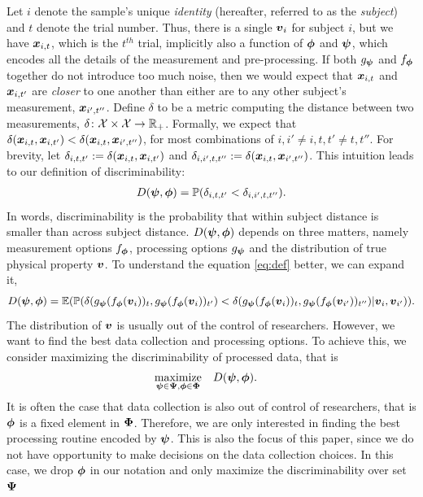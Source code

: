 \documentclass{article}
\begin{document}
Let $i$ denote the sample's unique \emph{identity} (hereafter, referred to as the \emph{subject}) and $t$ denote the trial number.  Thus, there is a single $\boldsymbol{v}_i$ for subject $i$, but we have $\boldsymbol{x}_{i,t}$, which is the $t^{th}$ trial, implicitly also a function of $\boldsymbol{\phi}$ and $\boldsymbol{\psi}$, which encodes all the details of the measurement and pre-processing. If both $g_{\boldsymbol{\psi}}$ and $f_{\boldsymbol{\phi}}$ together do not introduce too much noise, then we would expect that $\boldsymbol{x}_{i,t}$ and $\boldsymbol{x}_{i,t'}$ are \emph{closer} to one another than either are to any other subject's measurement, $\boldsymbol{x}_{i',t''}$. Define $\delta$ to be a metric computing the distance between two measurements, $\delta {\ensuremath{\colon}} \mathcal{X} \times \mathcal{X} \to \mathbb{R}_+$.  Formally, we expect that $\delta(\boldsymbol{x}_{i,t},\boldsymbol{x}_{i,t'}) < \delta(\boldsymbol{x}_{i,t},\boldsymbol{x}_{i',t''})$, for most combinations of $i,i'\neq i,t,t' \neq t,t''$.  
For brevity, let $\delta_{i,t,t'}:=\delta(\boldsymbol{x}_{i,t}, \boldsymbol{x}_{i,t'})$ and 
$\delta_{i,i',t,t''}:=\delta(\boldsymbol{x}_{i,t}, \boldsymbol{x}_{i',t''})$.  
This intuition leads to our definition of discriminability:
\begin{align}
	\label{eq:def}
	D(\boldsymbol{\psi},\boldsymbol{\phi}) = \mathbb{P}( \delta_{i,t,t'} < \delta_{i,i',t,t''}).
\end{align}
In words, discriminability is the probability that within subject distance is smaller than across subject distance. $D(\boldsymbol{\psi},\boldsymbol{\phi})$ depends on three matters, namely measurement options $f_{\boldsymbol{\phi}}$, processing options $g_{\boldsymbol{\psi}}$ and the distribution of true physical property $\boldsymbol{v}$. To understand the equation \ref{eq:def} better, we can expand it,
\begin{align}
	D(\boldsymbol{\psi},\boldsymbol{\phi}) = \mathbb{E}(\mathbb{P} (\delta(g_{\boldsymbol{\psi}} (f_{\boldsymbol{\phi}} (\boldsymbol{v}_i) )_t,g_{\boldsymbol{\psi}} (f_{\boldsymbol{\phi}} (\boldsymbol{v}_i) )_{t'})  < \delta(g_{\boldsymbol{\psi}} (f_{\boldsymbol{\phi}} (\boldsymbol{v}_i) )_t,g_{\boldsymbol{\psi}} (f_{\boldsymbol{\phi}} (\boldsymbol{v}_{i'}) )_{t''})|\boldsymbol{v}_i,\boldsymbol{v}_{i'})).
\end{align}
The distribution of $\boldsymbol{v}$ is usually out of the control of researchers. However, we want to find the best data collection and processing options. To achieve this, we consider maximizing the discriminability of processed data, that is  
\begin{equation} 
\begin{aligned}
& \underset{\boldsymbol{\psi} \in \boldsymbol{\Psi},\boldsymbol{\phi} \in \boldsymbol{\Phi}}{\text{maximize}}
& & D(\boldsymbol{\psi},\boldsymbol{\phi}).
\end{aligned}
\end{equation}
It is often the case that data collection is also out of control of researchers, that is $\boldsymbol{\phi}$ is a fixed element in $\boldsymbol{\Phi}$. Therefore, we are only interested in finding the best processing routine encoded by $\boldsymbol{\psi}$. This is also the focus of this paper, since we do not have opportunity to make decisions on the data collection choices. In this case, we drop $\boldsymbol{\phi}$ in our notation and only maximize the discriminability over set $\boldsymbol{\Psi}$
\end{document}

